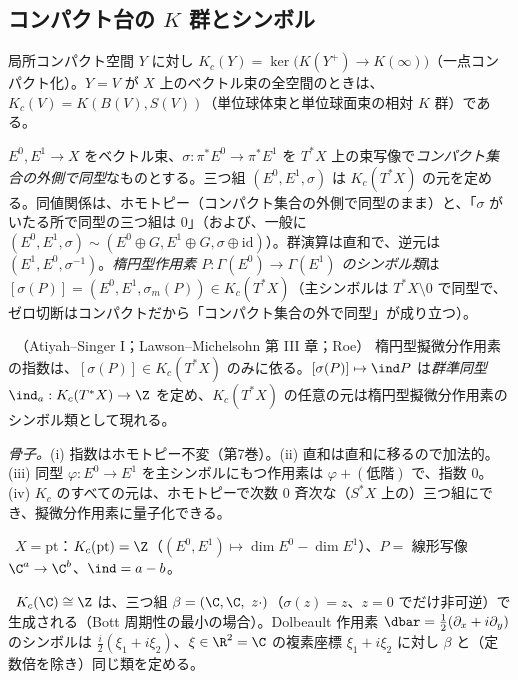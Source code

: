 \subsection{コンパクト台の $K$ 群とシンボル}
局所コンパクト空間 $Y$ に対し $K_c(Y)=\ker\bigl(K(Y^+)\to K(\infty)\bigr)$（一点コンパクト化）。$Y=V$ が $X$ 上のベクトル束の全空間のときは、$K_c(V)=K(B(V),S(V))$（単位球体束と単位球面束の相対 $K$ 群）である。
\begin{defn}[シンボルの類]\label{def:symbolclass}
$E^0,E^1\to X$ をベクトル束、$\sigma:\pi^*E^0\to\pi^*E^1$ を $T^*X$ 上の束写像で\emph{コンパクト集合の外側で同型}なものとする。三つ組 $(E^0,E^1,\sigma)$ は $K_c(T^*X)$ の元を定める。同値関係は、ホモトピー（コンパクト集合の外側で同型のまま）と、「$\sigma$ がいたる所で同型の三つ組は $0$」（および、一般に $(E^0,E^1,\sigma)\sim(E^0\oplus G,E^1\oplus G,\sigma\oplus\mathrm{id})$）。群演算は直和で、逆元は $(E^1,E^0,\sigma^{-1})$。\emph{楕円型作用素 $P:\Gamma(E^0)\to\Gamma(E^1)$ のシンボル類}は $[\sigma(P)]=(E^0,E^1,\sigma_m(P))\in K_c(T^*X)$（主シンボルは $T^*X\setminus0$ で同型で、ゼロ切断はコンパクトだから「コンパクト集合の外で同型」が成り立つ）。
\end{defn}
\begin{thm}[指数準同型]\label{thm:indhom}\tC\ （Atiyah--Singer I；Lawson--Michelsohn 第 III 章；Roe）
楕円型擬微分作用素の指数は、$[\sigma(P)]\in K_c(T^*X)$ のみに依る。$[\sigma(P)]\mapsto\ind P$ は\emph{群準同型} $\ind_a:K_c(T^*X)\to\Z$ を定め、$K_c(T^*X)$ の任意の元は楕円型擬微分作用素のシンボル類として現れる。
\end{thm}
\noindent\emph{骨子。}(i) 指数はホモトピー不変（第7巻）。(ii) 直和は直和に移るので加法的。(iii) 同型 $\varphi:E^0\to E^1$ を主シンボルにもつ作用素は $\varphi+(\text{低階})$ で、指数 $0$。(iv) $K_c$ のすべての元は、ホモトピーで次数 $0$ 斉次な（$S^*X$ 上の）三つ組にでき、擬微分作用素に量子化できる。
\begin{ex}[点]\label{ex:Kpt}\tP\
$X=\mathrm{pt}$：$K_c(\mathrm{pt})=\Z$（$(E^0,E^1)\mapsto\dim E^0-\dim E^1$）、$P=$ 線形写像 $\C^a\to\C^b$、$\ind=a-b$。
\end{ex}
\begin{ex}[Bott 生成元：$\C$ 上の $z$]\label{ex:Bott}\tC\
$K_c(\C)\cong\Z$ は、三つ組 $\beta=(\C,\C,\ z\cdot)$（$\sigma(z)=z$、$z=0$ でだけ非可逆）で生成される（Bott 周期性の最小の場合）。Dolbeault 作用素 $\dbar=\frac12(\partial_x+i\partial_y)$ のシンボルは $\frac i2(\xi_1+i\xi_2)$、$\xi\in\R^2=\C$ の複素座標 $\xi_1+i\xi_2$ に対し $\beta$ と（定数倍を除き）同じ類を定める。
\end{ex}
